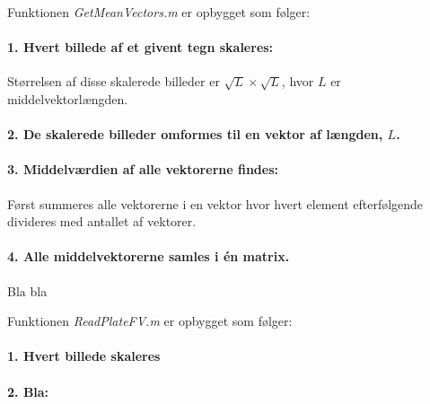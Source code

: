 Funktionen \textit{GetMeanVectors.m} er opbygget som følger:


\paragraph{1. Hvert billede af et givent tegn skaleres:} Størrelsen af disse skalerede billeder er $\sqrt{L} \times \sqrt{L}$, hvor $L$ er middelvektorlængden.

\paragraph{2. De skalerede billeder omformes til en vektor af længden, $L$.}

\paragraph{3. Middelværdien af alle vektorerne findes:} Først summeres alle vektorerne i en vektor hvor hvert element efterfølgende divideres med antallet af vektorer.

\paragraph{4. Alle middelvektorerne samles i én matrix.} Bla bla


Funktionen \textit{ReadPlateFV.m} er opbygget som følger:

\paragraph{1. Hvert billede skaleres}

\paragraph{2. Bla:}


